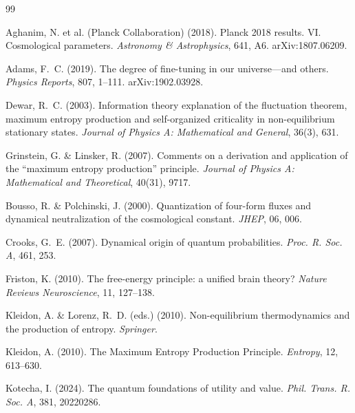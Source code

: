 \documentclass[12pt,a4paper]{article}
\theoremstyle{remark}
\begin{document}

\begin{thebibliography}{99}

Aghanim, N. et al. (Planck Collaboration) (2018).
\newblock Planck 2018 results. VI. Cosmological parameters.
\newblock \textit{Astronomy \& Astrophysics}, 641, A6.
\newblock arXiv:1807.06209.

Adams, F.~C. (2019).
\newblock The degree of fine-tuning in our universe---and others.
\newblock \textit{Physics Reports}, 807, 1--111.
\newblock arXiv:1902.03928.

Dewar, R.~C. (2003).
\newblock Information theory explanation of the fluctuation theorem, maximum entropy production and self-organized criticality in non-equilibrium stationary states.
\newblock \textit{Journal of Physics A: Mathematical and General}, 36(3), 631.

Grinstein, G. \& Linsker, R. (2007).
\newblock Comments on a derivation and application of the ``maximum entropy production'' principle.
\newblock \textit{Journal of Physics A: Mathematical and Theoretical}, 40(31), 9717.

Bousso, R. \& Polchinski, J. (2000).
\newblock Quantization of four-form fluxes and dynamical neutralization of the cosmological constant.
\newblock \textit{JHEP}, 06, 006.

Crooks, G.~E. (2007).
\newblock Dynamical origin of quantum probabilities.
\newblock \textit{Proc. R. Soc. A}, 461, 253.

Friston, K. (2010).
\newblock The free-energy principle: a unified brain theory?
\newblock \textit{Nature Reviews Neuroscience}, 11, 127--138.

Kleidon, A. \& Lorenz, R.~D. (eds.) (2010).
\newblock Non-equilibrium thermodynamics and the production of entropy.
\newblock \textit{Springer}.

Kleidon, A. (2010).
\newblock The Maximum Entropy Production Principle.
\newblock \textit{Entropy}, 12, 613--630.

Kotecha, I. (2024).
\newblock The quantum foundations of utility and value.
\newblock \textit{Phil. Trans. R. Soc. A}, 381, 20220286.


\end{thebibliography}
\end{document}

